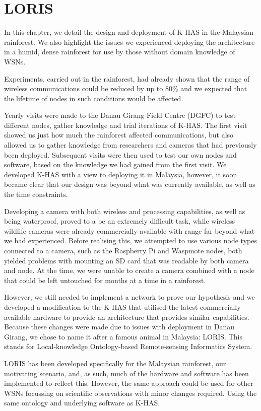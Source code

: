 \chapter{LORIS}
	In this chapter, we detail the design and deployment of K-HAS in the Malaysian rainforest. We also highlight the issues we experienced deploying the architecture in a humid, dense rainforest for use by those without domain knowledge of WSNs.
	
	Experiments, carried out in the rainforest, had already shown that the range of wireless communications could be reduced by up to 80\% and we expected that the lifetime of nodes in such conditions would be affected.
	
	Yearly visits were made to the Danau Girang Field Centre (DGFC) to test different nodes, gather knowledge and trial iterations of K-HAS. The first visit showed us just how much the rainforest affected communications, but also allowed us to gather knowledge from researchers and cameras that had previously been deployed. Subsequent visits were then used to test our own nodes and software, based on the knowledge we had gained from the first visit. We developed K-HAS with a view to deploying it in Malaysia, however, it soon became clear that our design was  beyond what was currently available, as well as the time constraints.
	
	Developing a camera with both wireless and processing capabilities, as well as being waterproof, proved to a be an extremely difficult task, while wireless wildlife cameras were already commercially available with range far beyond what we had experienced. Before realising this, we attempted to use various node types connected to a camera, such as the Raspberry Pi and Waspmote nodes, both yielded problems with mounting an SD card that was readable by both camera and node. At the time, we were unable to create a camera combined with a node that could be left untouched for months at a time in a rainforest.
	
	However, we still needed to implement a network to prove our hypothesis and we developed a modification to the K-HAS that utilised the latest commercially available hardware to provide an architecture that provides similar capabilities. Because these changes were made due to issues with deployment in Danau Girang, we chose to name it after a famous animal in Malaysia: LORIS. This stands for Local-knowledge Ontology-based Remote-sensing Informatics System.
	
	LORIS has been developed specifically for the Malaysian rainforest, our motivating scenario, and, as such, much of the hardware and software has been implemented to reflect this. However, the same approach could be used for other WSNs focussing on scientific observations with minor changes required. Using the same ontology and underlying software as K-HAS.
	
